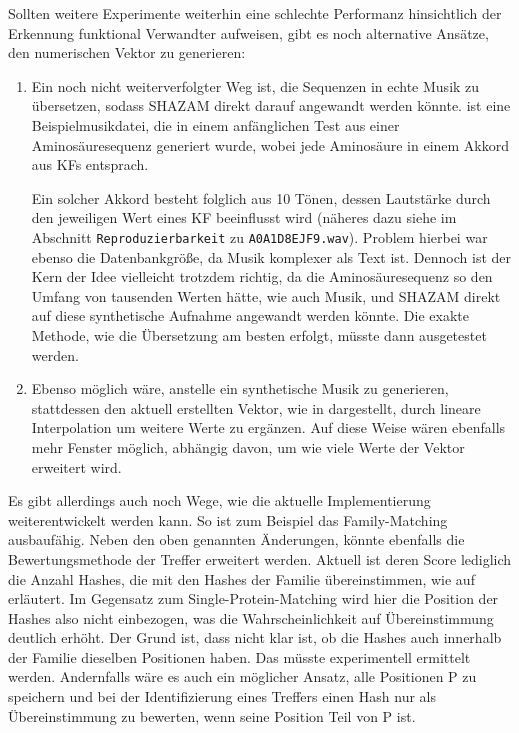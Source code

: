         Sollten weitere Experimente weiterhin eine schlechte Performanz hinsichtlich der Erkennung funktional Verwandter aufweisen, gibt es noch alternative Ansätze, den numerischen Vektor zu generieren:
        \begin{enumerate}
            \item Ein noch nicht weiterverfolgter Weg ist, die Sequenzen in echte Musik zu übersetzen, sodass SHAZAM direkt darauf angewandt werden könnte.  ist eine Beispielmusikdatei, die in einem anfänglichen Test aus einer Aminosäuresequenz generiert wurde, wobei jede Aminosäure in einem Akkord aus \acp{KF} entsprach.

            Ein solcher Akkord besteht folglich aus 10 Tönen, dessen Lautstärke durch den jeweiligen Wert eines \ac{KF} beeinflusst wird (näheres dazu siehe  im Abschnitt \texttt{Reproduzierbarkeit} zu \texttt{A0A1D8EJF9.wav}). Problem hierbei war ebenso die Datenbankgröße, da Musik komplexer als Text ist. Dennoch ist der Kern der Idee vielleicht trotzdem richtig, da die Aminosäuresequenz so den Umfang von tausenden Werten hätte, wie auch Musik, und SHAZAM direkt auf diese synthetische Aufnahme angewandt werden könnte. Die exakte Methode, wie die Übersetzung am besten erfolgt, müsste dann ausgetestet werden.

            \item Ebenso möglich wäre, anstelle ein synthetische Musik zu generieren, stattdessen den aktuell erstellten Vektor, wie in  dargestellt, durch lineare Interpolation um weitere Werte zu ergänzen. Auf diese Weise wären ebenfalls mehr Fenster möglich, abhängig davon, um wie viele Werte der Vektor erweitert wird.
        \end{enumerate}
        
        Es gibt allerdings auch noch Wege, wie die aktuelle Implementierung weiterentwickelt werden kann. So ist zum Beispiel das Family-Matching ausbaufähig. Neben den oben genannten Änderungen, könnte ebenfalls die Bewertungsmethode der Treffer erweitert werden. Aktuell ist deren Score lediglich die Anzahl Hashes, die mit den Hashes der Familie übereinstimmen, wie auf  erläutert. Im Gegensatz zum Single-Protein-Matching wird hier die Position der Hashes also nicht einbezogen, was die Wahrscheinlichkeit auf Übereinstimmung deutlich erhöht. Der Grund ist, dass nicht klar ist, ob die Hashes auch innerhalb der Familie dieselben Positionen haben. Das müsste experimentell ermittelt werden. Andernfalls wäre es auch ein möglicher Ansatz, alle Positionen P zu speichern und bei der Identifizierung eines Treffers einen Hash nur als Übereinstimmung zu bewerten, wenn seine Position Teil von P ist.

